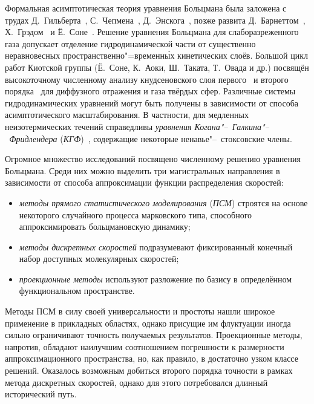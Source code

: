 {\progress}

Формальная асимптотическая теория уравнения Больцмана была заложена с трудах Д.~Гильберта~\autocite{Hilbert1912},
С.~Чепмена~\autocite{Chapman1916}, Д.~Энскога~\autocite{Enskog1917},
позже развита Д.~Барнеттом~\autocite{Burnett1935}, Х.~Грэдом~\autocite{Grad1963a} и Ё.~Соне~\autocite{Sone2002}.
Решение уравнения Больцмана для слаборазреженного газа допускает отделение гидродинамической части
от существенно неравновесных пространственно"=временн\'{ы}х кинетических слоёв.
Большой цикл работ Киотской группы (Ё.~Соне, К.~Аоки, Ш.~Таката, Т.~Овада и др.)
посвящён высокоточному численному анализу кнудсеновского слоя первого~\autocite{Ohwada1989creep, Ohwada1989jump}
и второго порядка~\autocite{Ohwada1992, Takata2015second, Takata2015curvature}
для диффузного отражения и газа твёрдых сфер.
Различные системы гидродинамических уравнений могут быть получены в зависимости от способа асимптотического масштабирования.
В частности, для медленных неизотермических течений справедливы
\emph{уравнения Когана"--~Галкина"--~Фридлендера} (\emph{КГФ})~\autocite{Kogan1976},
содержащие некоторые ненавье"--~стоксовские члены.

Огромное множество исследований посвящено численному решению уравнения Больцмана.
Среди них можно выделить три магистральных направления в зависимости от способа аппроксимации
функции распределения скоростей:
\begin{itemize}
    \item \emph{методы прямого статистического моделирования} (\emph{ПСМ})
    строятся на основе некоторого случайного процесса марковского типа,
    способного аппроксимировать больцмановскую динамику;
    \item \emph{методы дискретных скоростей} подразумевают фиксированный конечный набор доступных молекулярных скоростей;
    \item \emph{проекционные методы} используют разложение по базису в определённом функциональном пространстве.
\end{itemize}
Методы ПСМ в силу своей универсальности и простоты нашли широкое применение в прикладных областях,
однако присущие им флуктуации иногда сильно ограничивают точность получаемых результатов.
Проекционные методы, напротив, обладают наилучшим соотношением погрешности к размерности аппроксимационного пространства,
но, как правило, в достаточно узком классе решений.
Оказалось возможным добиться второго порядка точности в рамках метода дискретных скоростей,
однако для этого потребовался длинный исторический путь.


